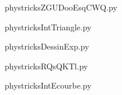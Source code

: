     

    \clearpage
    


    \newcommand{\CaptionFigZGUDooEsqCWQ}{<+Type your caption here+>}
    \begin{center}
        
    \end{center}
    phystricksZGUDooEsqCWQ.py

    

    \clearpage
    


    \newcommand{\CaptionFigIntTriangle}{<+Type your caption here+>}
    \begin{center}
        
    \end{center}
    phystricksIntTriangle.py

    

    \clearpage
    


    \newcommand{\CaptionFigDessinExp}{<+Type your caption here+>}
    \begin{center}
        
    \end{center}
    phystricksDessinExp.py

    

    \clearpage
    


    \newcommand{\CaptionFigRQsQKTl}{<+Type your caption here+>}
    \begin{center}
        
    \end{center}
    phystricksRQsQKTl.py

    

    \clearpage
    


    \newcommand{\CaptionFigIntEcourbe}{<+Type your caption here+>}
    \begin{center}
        
    \end{center}
    phystricksIntEcourbe.py

    

    \clearpage
    


